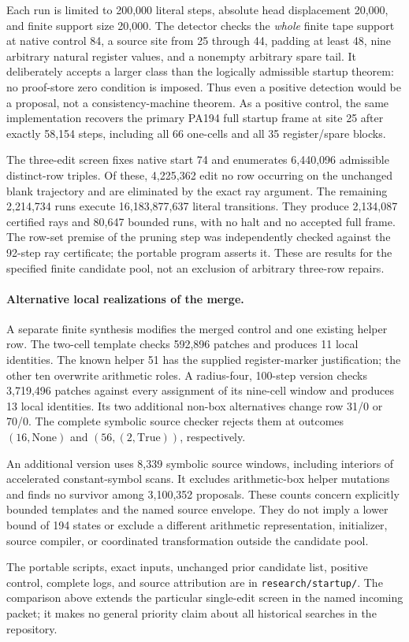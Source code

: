 Each run is limited to 200,000 literal steps, absolute head displacement
20,000, and finite support size 20,000. The detector checks the \emph{whole}
finite tape support at native control 84, a source site from 25 through 44,
padding at least 48, nine arbitrary natural register values, and a
nonempty arbitrary spare tail. It deliberately accepts a larger class than
the logically admissible startup theorem: no proof-store zero condition is
imposed. Thus even a positive detection would be a proposal, not a
consistency-machine theorem. As a positive control, the same implementation
recovers the primary PA194 full startup frame at site 25 after exactly
58,154 steps, including all 66 one-cells and all 35 register/spare blocks.

The three-edit screen fixes native start 74 and enumerates 6,440,096
admissible distinct-row triples. Of these, 4,225,362 edit no row occurring
on the unchanged blank trajectory and are eliminated by the exact ray
argument. The remaining 2,214,734 runs execute 16,183,877,637 literal
transitions. They produce 2,134,087 certified rays and 80,647 bounded runs,
with no halt and no accepted full frame. The row-set premise of the pruning
step was independently checked against the 92-step ray certificate; the
portable program asserts it. These are results for the specified finite
candidate pool, not an exclusion of arbitrary three-row repairs.

\paragraph{Alternative local realizations of the merge.}
A separate finite synthesis modifies the merged control and one existing
helper row. The two-cell template checks 592,896 patches and produces 11
local identities. The known helper 51 has the supplied register-marker
justification; the other ten overwrite arithmetic roles. A radius-four,
100-step version checks 3,719,496 patches against every assignment of its
nine-cell window and produces 13 local identities. Its two additional
non-box alternatives change row 31/0 or 70/0. The complete symbolic source
checker rejects them at outcomes $(16,\mathrm{None})$ and
$(56,(2,\mathrm{True}))$, respectively.

An additional version uses 8,339 symbolic source windows, including
interiors of accelerated constant-symbol scans. It excludes arithmetic-box
helper mutations and finds no survivor among 3,100,352 proposals. These
counts concern explicitly bounded templates and the named source envelope.
They do not imply a lower bound of 194 states or exclude a different
arithmetic representation, initializer, source compiler, or coordinated
transformation outside the candidate pool.

The portable scripts, exact inputs, unchanged prior candidate list,
positive control, complete logs, and source attribution are in
\texttt{research/startup/}. The comparison above extends the particular
single-edit screen in the named incoming packet; it makes no general
priority claim about all historical searches in the repository.
